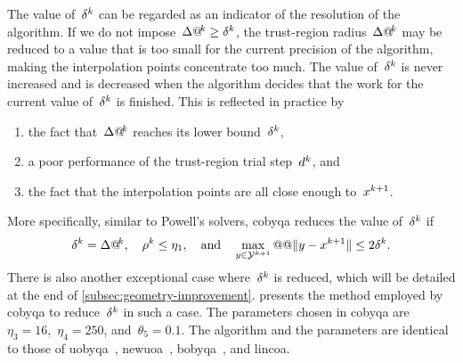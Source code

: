 The value of~$\radlb[k]$ can be regarded as an indicator of the resolution of the algorithm.
If we do not impose~$\rad[k] \ge \radlb[k]$, the trust-region radius~$\rad[k]$ may be reduced to a value that is too small for the current precision of the algorithm, making the interpolation points concentrate too much.
The value of~$\radlb[k]$ is never increased and is decreased when the algorithm decides that the work for the current value of~$\radlb[k]$ is finished.
This is reflected in practice by
\begin{enumerate}
    \item the fact that~$\rad[k]$ reaches its lower bound~$\radlb[k]$,
    \item a poor performance of the trust-region trial step~$\step[k]$, and
    \item the fact that the interpolation points are all close enough to~$\iter[k + 1]$.
\end{enumerate}
More specifically, similar to Powell's solvers, \gls{cobyqa} reduces the value of~$\radlb[k]$ if
\begin{equation*}
    \radlb[k] = \rad[k], \quad \ratio[k] \le \eta_1, \quad \text{and} \quad \max_{y \in \xpt[k + 1]} @@ \norm{y  - \iter[k + 1]} \le 2 \radlb[k].
\end{equation*}
There is also another exceptional case where~$\radlb[k]$ is reduced, which will be detailed at the end of \cref{subsec:geometry-improvement}.
 presents the method employed by \gls{cobyqa} to reduce~$\radlb[k]$ in such a case.
The parameters chosen in \gls{cobyqa} are~$\eta_3 = 16$,~$\eta_4 = 250$, and~$\theta_5 = 0.1$.
The algorithm and the parameters are identical to those of \gls{uobyqa}~\cite{Powell_2002}, \gls{newuoa}~\cite{Powell_2006}, \gls{bobyqa}~\cite{Powell_2009}, and \gls{lincoa}.

